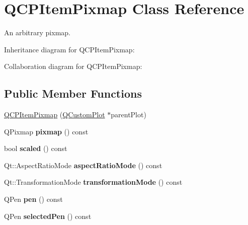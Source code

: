\hypertarget{class_q_c_p_item_pixmap}{}\section{Q\+C\+P\+Item\+Pixmap Class Reference}
\label{class_q_c_p_item_pixmap}


An arbitrary pixmap.  




Inheritance diagram for Q\+C\+P\+Item\+Pixmap\+:


Collaboration diagram for Q\+C\+P\+Item\+Pixmap\+:
\subsection*{Public Member Functions}
\begin{DoxyCompactItemize}
\item 
\hyperlink{class_q_c_p_item_pixmap_aa6de42a37261b21a5480e7da122345c3}{Q\+C\+P\+Item\+Pixmap} (\hyperlink{class_q_custom_plot}{Q\+Custom\+Plot} $\ast$parent\+Plot)
\item 
Q\+Pixmap {\bfseries pixmap} () const \hypertarget{class_q_c_p_item_pixmap_a73dea89e0eb45127a2705e2c7991b8d8}{}\label{class_q_c_p_item_pixmap_a73dea89e0eb45127a2705e2c7991b8d8}

\item 
bool {\bfseries scaled} () const \hypertarget{class_q_c_p_item_pixmap_a54026b89dff3c60376c2360f01b6fb83}{}\label{class_q_c_p_item_pixmap_a54026b89dff3c60376c2360f01b6fb83}

\item 
Qt\+::\+Aspect\+Ratio\+Mode {\bfseries aspect\+Ratio\+Mode} () const \hypertarget{class_q_c_p_item_pixmap_ac5b95c097169e107a61eebbb7c77523c}{}\label{class_q_c_p_item_pixmap_ac5b95c097169e107a61eebbb7c77523c}

\item 
Qt\+::\+Transformation\+Mode {\bfseries transformation\+Mode} () const \hypertarget{class_q_c_p_item_pixmap_a1d4751a7b9588354fc8e726d891153f7}{}\label{class_q_c_p_item_pixmap_a1d4751a7b9588354fc8e726d891153f7}

\item 
Q\+Pen {\bfseries pen} () const \hypertarget{class_q_c_p_item_pixmap_ab2b821c80cfade589472e933b9c4361f}{}\label{class_q_c_p_item_pixmap_ab2b821c80cfade589472e933b9c4361f}

\item 
Q\+Pen {\bfseries selected\+Pen} () const \hypertarget{class_q_c_p_item_pixmap_af8e839d7c7b84e214608feda3caec2bc}{}\label{class_q_c_p_item_pixmap_af8e839d7c7b84e214608feda3caec2bc}


\end{DoxyCompactItemize}
